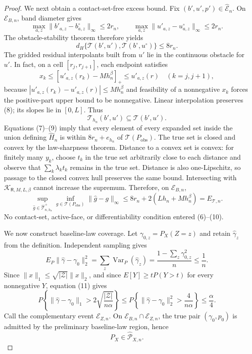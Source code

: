 \documentclass{article}
\begin{document}
\begin{proof}
We next obtain a contact-set-free excess bound.  Fix \((b',u',p')\in\widehat{\mathcal E}_n\).  On \(\mathcal E_{B,n}\), band diameter gives
\[
\max_{a,z}\|b'_{a,z}-b^\circ_{a,z}\|_\infty\leq2r_n,
\qquad
\max_{a,z}\|u'_{a,z}-u^\circ_{a,z}\|_\infty\leq2r_n.
\tag{6}
\]
The obstacle-stability theorem therefore yields
\[
d_H\{\mathcal T(b',u'),\mathcal T(b^\circ,u^\circ)\}\leq8r_n.
\tag{7}
\]
The gridded residual interpolants built from \(u'\) lie in the continuous obstacle for \(u'\).  In fact, on a cell \([r_j,r_{j+1}]\), each endpoint satisfies
\[
x_k\leq[u'_{a,z}(r_k)-Mh_n^\beta]_+\leq u'_{a,z}(r)
\quad(k=j,j+1),
\tag{8}
\]
because \(|u'_{a,z}(r_k)-u'_{a,z}(r)|\leq Mh_n^\beta\) and feasibility of a nonnegative \(x_k\) forces the positive-part upper bound to be nonnegative.  Linear interpolation preserves (8); its slopes lie in \([0,L]\).  Thus
\[
\mathcal T_{h_n}(b',u')\subseteq\mathcal T(b',u').
\tag{9}
\]
Equations (7)--(9) imply that every element of every expanded set inside the union defining \(\widehat H_n\) is within \(8r_n+e_{h_n}\) of \(\mathcal T(P_{\mathrm{obs}})\).  The true set is closed and convex by the law-sharpness theorem.  Distance to a convex set is convex: for finitely many \(y_k\), choose \(t_k\) in the true set arbitrarily close to each distance and observe that \(\sum_k\lambda_kt_k\) remains in the true set.  Distance is also one-Lipschitz, so passage to the closed convex hull preserves the same bound.  Intersecting with \(\mathcal K_{\mathsf R,M,L,\beta}\) cannot increase the supremum.  Therefore, on \(\mathcal E_{B,n}\),
\[
\sup_{\widehat g\in\widehat{\mathcal T}_{n,h_n}^{+}}
\inf_{g\in\mathcal T(P_{\mathrm{obs}})}\|\widehat g-g\|_\infty
\leq8r_n+2(Lh_n+Mh_n^\beta)=E_{\mathcal T,n}.
\tag{10}
\]
No contact-set, active-face, or differentiability condition entered (6)--(10).

We now construct baseline-law coverage.  Let \(\gamma_{0,z}=P_X(Z=z)\) and retain \(\widehat\gamma_z\) from the definition.  Independent sampling gives
\[
E_P\|\widehat\gamma-\gamma_0\|_2^2
=\sum_z\operatorname{Var}_P(\widehat\gamma_z)
=\frac{1-\sum_z\gamma_{0,z}^2}{n}
\leq\frac1n.
\tag{11}
\]
Since \(\|x\|_1\leq\sqrt{|\mathcal Z|}\|x\|_2\), and since \(E[Y]\geq tP(Y>t)\) for every nonnegative \(Y\), equation (11) gives
\[
P\!\left\{\|\widehat\gamma-\gamma_0\|_1>
2\sqrt{\frac{|\mathcal Z|}{n\alpha}}\right\}
\leq
P\!\left\{\|\widehat\gamma-\gamma_0\|_2^2>\frac4{n\alpha}\right\}
\leq\frac\alpha4.
\tag{12}
\]
Call the complementary event \(\mathcal E_{Z,n}\).  On \(\mathcal E_{B,n}\cap\mathcal E_{Z,n}\), the true pair \((\gamma_0,p_0)\) is admitted by the preliminary baseline-law region, hence
\[
P_X\in\widehat{\mathcal P}_{X,n}.
\tag{13}
\]


\end{proof}
\end{document}
